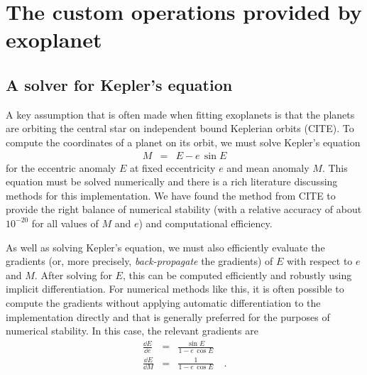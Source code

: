 \documentclass[modern]{aastex62}
\begin{document}
\section{The custom operations provided by exoplanet}

\subsection{A solver for Kepler's equation}

A key assumption that is often made when fitting exoplanets is that the
planets are orbiting the central star on independent bound Keplerian orbits
(CITE).
To compute the coordinates of a planet on its orbit, we must solve Kepler's
equation
\begin{eqnarray}
M &=& E - e\,\sin E
\end{eqnarray}
for the eccentric anomaly $E$ at fixed eccentricity $e$ and mean anomaly $M$.
This equation must be solved numerically and there is a rich literature
discussing methods for this implementation.
We have found the method from CITE to provide the right balance of numerical
stability (with a relative accuracy of about $10^{-20}$ for all values of $M$
and $e$) and computational efficiency.

As well as solving Kepler's equation, we must also efficiently evaluate the
gradients (or, more precisely, \emph{back-propagate} the gradients) of $E$
with respect to $e$ and $M$.
After solving for $E$, this can be computed efficiently and robustly using
implicit differentiation.
For numerical methods like this, it is often possible to compute the gradients
without applying automatic differentiation to the implementation directly and
that is generally preferred for the purposes of numerical stability.
In this case, the relevant gradients are
\begin{eqnarray}
\frac{\dd E}{\dd e} &=& \frac{\sin E}{1 - e\,\cos E} \\
\frac{\dd E}{\dd M} &=& \frac{1}{1 - e\,\cos E} \quad.
\end{eqnarray}
\end{document}
